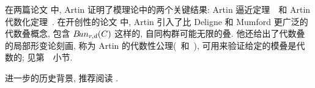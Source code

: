 在两篇论文 \cite{Art69a,Art69b} 中, Artin 证明了模理论中的两个关键结果: Artin 逼近定理~~和 Artin 代数化定理~. 在开创性的论文 \cite{Art74b} 中, Artin 引入了比 Deligne 和 Mumford 更广泛的代数叠概念, 包含 $B\!un_{r,d}(C)$ 这样的, 自同构群可能无限的叠. 他还给出了代数叠的局部形变论刻画, 称为 Artin 的代数性公理(~和~), 可用来验证给定的模叠是代数的; 见第~~小节.

进一步的历史背景, 推荐阅读 \cite{Mum75a,Oor81,Kle05,JP13,AJP16,Kol21}.
